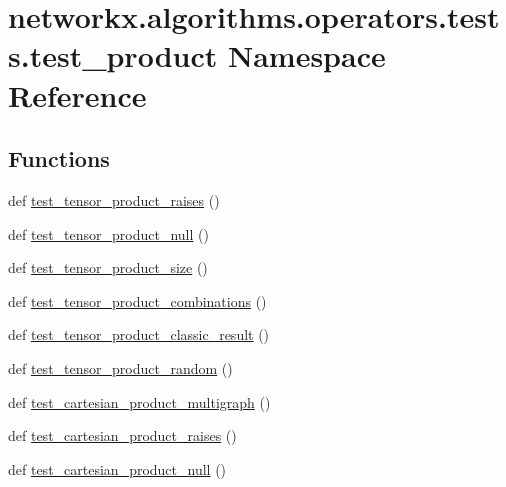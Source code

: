 \hypertarget{namespacenetworkx_1_1algorithms_1_1operators_1_1tests_1_1test__product}{}\section{networkx.\+algorithms.\+operators.\+tests.\+test\+\_\+product Namespace Reference}
\label{namespacenetworkx_1_1algorithms_1_1operators_1_1tests_1_1test__product}
\subsection*{Functions}
\begin{DoxyCompactItemize}
\item 
def \hyperlink{namespacenetworkx_1_1algorithms_1_1operators_1_1tests_1_1test__product_a96491cf7e412f1b49590042017764713}{test\+\_\+tensor\+\_\+product\+\_\+raises} ()
\item 
def \hyperlink{namespacenetworkx_1_1algorithms_1_1operators_1_1tests_1_1test__product_a8e2a991c0d8eba49bf96e6f63781cd3d}{test\+\_\+tensor\+\_\+product\+\_\+null} ()
\item 
def \hyperlink{namespacenetworkx_1_1algorithms_1_1operators_1_1tests_1_1test__product_a851ec454a040bc0e2e033c2823786569}{test\+\_\+tensor\+\_\+product\+\_\+size} ()
\item 
def \hyperlink{namespacenetworkx_1_1algorithms_1_1operators_1_1tests_1_1test__product_a17987c761a525281c068ad88e65e625c}{test\+\_\+tensor\+\_\+product\+\_\+combinations} ()
\item 
def \hyperlink{namespacenetworkx_1_1algorithms_1_1operators_1_1tests_1_1test__product_a13544de753b16c1a103428e5b51c09fc}{test\+\_\+tensor\+\_\+product\+\_\+classic\+\_\+result} ()
\item 
def \hyperlink{namespacenetworkx_1_1algorithms_1_1operators_1_1tests_1_1test__product_a503f247a8723996f4a8c4e4ebb05178e}{test\+\_\+tensor\+\_\+product\+\_\+random} ()
\item 
def \hyperlink{namespacenetworkx_1_1algorithms_1_1operators_1_1tests_1_1test__product_a493d082e26dc5a87cd3ed038a133a6cd}{test\+\_\+cartesian\+\_\+product\+\_\+multigraph} ()
\item 
def \hyperlink{namespacenetworkx_1_1algorithms_1_1operators_1_1tests_1_1test__product_af3869e16b82182f52da80db8c6bb729d}{test\+\_\+cartesian\+\_\+product\+\_\+raises} ()
\item 
def \hyperlink{namespacenetworkx_1_1algorithms_1_1operators_1_1tests_1_1test__product_a937776e118e388057544b1c3c33f2f5c}{test\+\_\+cartesian\+\_\+product\+\_\+null} ()

\end{DoxyCompactItemize}
